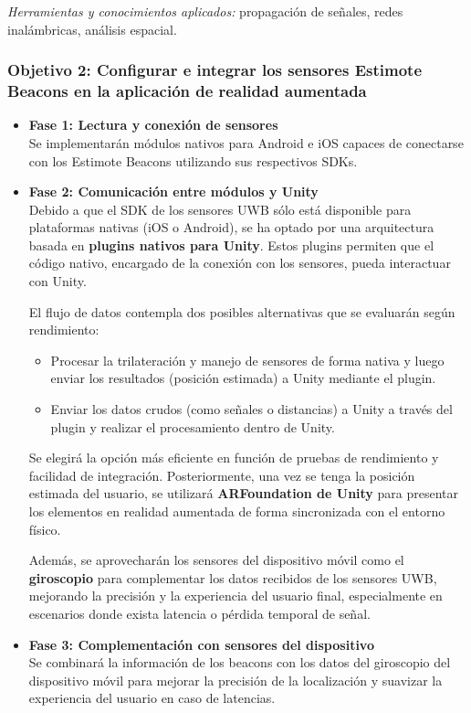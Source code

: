 \documentclass{article}
\begin{document}
\textit{Herramientas y conocimientos aplicados:} propagación de señales, redes inalámbricas, análisis espacial.

\subsubsection{Objetivo 2: Configurar e integrar los sensores Estimote Beacons en la aplicación de realidad aumentada}


\begin{itemize}
    \item \textbf{Fase 1: Lectura y conexión de sensores} \\
    Se implementarán módulos nativos para Android e iOS capaces de conectarse con los Estimote Beacons utilizando sus respectivos SDKs.

    \item \textbf{Fase 2: Comunicación entre módulos y Unity} \\
    Debido a que el SDK de los sensores UWB sólo está disponible para plataformas nativas (iOS o Android), se ha optado por una arquitectura basada en \textbf{plugins nativos para Unity}. Estos plugins permiten que el código nativo, encargado de la conexión con los sensores, pueda interactuar con Unity.

    El flujo de datos contempla dos posibles alternativas que se evaluarán según rendimiento:
    \begin{itemize}
        \item Procesar la trilateración y manejo de sensores de forma nativa y luego enviar los resultados (posición estimada) a Unity mediante el plugin.
        \item Enviar los datos crudos (como señales o distancias) a Unity a través del plugin y realizar el procesamiento dentro de Unity.
    \end{itemize}

    Se elegirá la opción más eficiente en función de pruebas de rendimiento y facilidad de integración. Posteriormente, una vez se tenga la posición estimada del usuario, se utilizará \textbf{ARFoundation de Unity} para presentar los elementos en realidad aumentada de forma sincronizada con el entorno físico.

    Además, se aprovecharán los sensores del dispositivo móvil como el \textbf{giroscopio} para complementar los datos recibidos de los sensores UWB, mejorando la precisión y la experiencia del usuario final, especialmente en escenarios donde exista latencia o pérdida temporal de señal.

    \item \textbf{Fase 3: Complementación con sensores del dispositivo} \\
    Se combinará la información de los beacons con los datos del giroscopio del dispositivo móvil para mejorar la precisión de la localización y suavizar la experiencia del usuario en caso de latencias.
\end{itemize}
\end{document}
